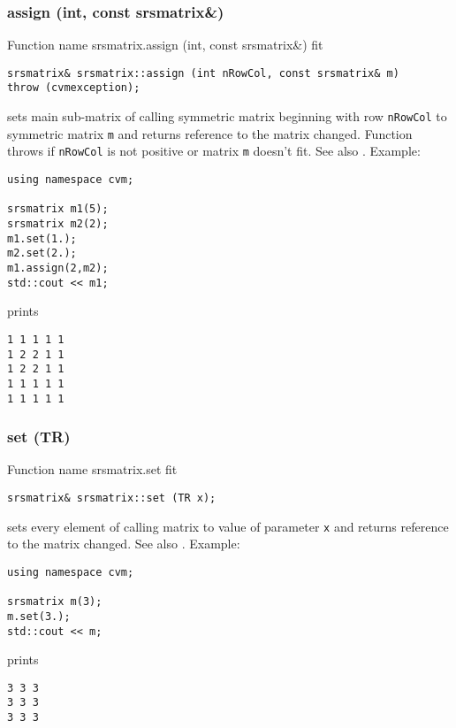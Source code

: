 \subsubsection{assign (int, const srsmatrix\&)}
Function%
\pdfdest name {srsmatrix.assign (int, const srsmatrix&)} fit
\begin{verbatim}
srsmatrix& srsmatrix::assign (int nRowCol, const srsmatrix& m)
throw (cvmexception);
\end{verbatim}
sets main sub-matrix of  calling symmetric matrix beginning with \Based row
\verb"nRowCol" to  symmetric matrix \verb"m" and
returns  reference to the matrix changed.
Function throws 
  if \verb"nRowCol"
is not positive or matrix \verb"m" doesn't fit.
See also .
Example:
\begin{Verbatim}
using namespace cvm;

srsmatrix m1(5);
srsmatrix m2(2);
m1.set(1.);
m2.set(2.);
m1.assign(2,m2);
std::cout << m1;
\end{Verbatim}
prints
\begin{Verbatim}
1 1 1 1 1
1 2 2 1 1
1 2 2 1 1
1 1 1 1 1
1 1 1 1 1
\end{Verbatim}
\newpage







\subsubsection{set (TR)}
Function%
\pdfdest name {srsmatrix.set} fit
\begin{verbatim}
srsmatrix& srsmatrix::set (TR x);
\end{verbatim}
sets every element of  calling matrix to  value of
parameter \verb"x" and returns  reference to
the matrix changed.
See also .
Example:
\begin{Verbatim}
using namespace cvm;

srsmatrix m(3);
m.set(3.);
std::cout << m;
\end{Verbatim}
prints
\begin{Verbatim}
3 3 3
3 3 3
3 3 3
\end{Verbatim}
\newpage



